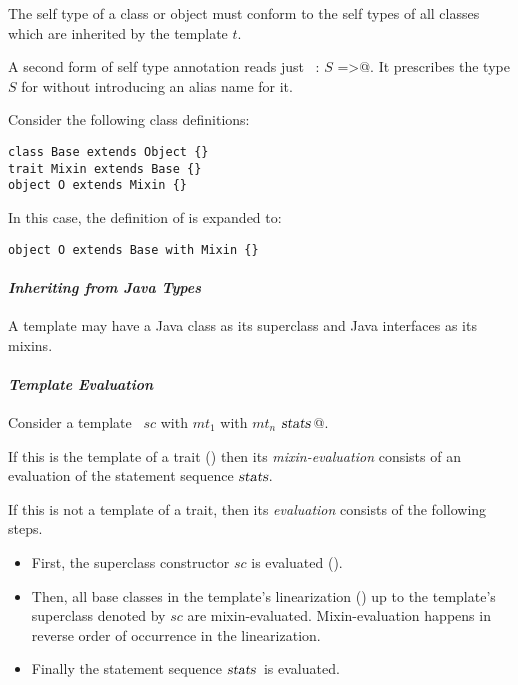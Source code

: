 The self type of a class or object must conform to the self types of
all classes which are inherited by the template $t$. 

A second form of self type annotation reads just 
~\lstinline@this: $S$ =>@. It prescribes the type $S$ for \lstinline@this@
without introducing an alias name for it. 

\example Consider the following class definitions:

\begin{lstlisting}
class Base extends Object {}
trait Mixin extends Base {}
object O extends Mixin {}
\end{lstlisting}
In this case, the definition of  is expanded to:
\begin{lstlisting}
object O extends Base with Mixin {}
\end{lstlisting}



\paragraph{\em Inheriting from Java Types} A template may have a Java class as
its superclass and Java interfaces as its mixins. 

\paragraph{\em Template Evaluation}
Consider a template ~\lstinline@$sc$ with $mt_1$ with $mt_n$ {$\mbox{\sl stats}\,$}@.

If this is the template of a trait () then its {\em
mixin-evaluation} consists of an evaluation of the statement sequence
$\mbox{\sl stats}$.

If this is not a template of a trait, then its {\em evaluation}
consists of the following steps.
\begin{itemize}
\item
First, the superclass constructor $sc$ is evaluated ().
\item
Then, all base classes in the template's linearization
() up to the
template's superclass denoted by $sc$ are
mixin-evaluated. Mixin-evaluation happens in reverse order of
occurrence in the linearization.
\item 
Finally the statement sequence $\mbox{\sl stats}\,$ is evaluated.
\end{itemize}

